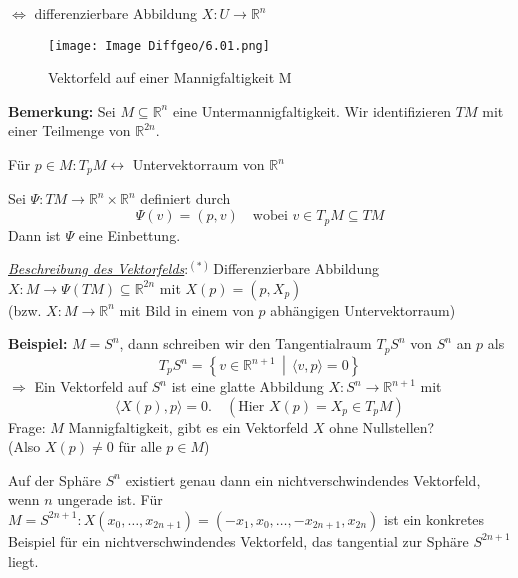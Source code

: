 \documentclass[fleqn, 12pt, letterpaper]{article}
\newcommand{\txt}[1]{\text{#1}}
\begin{document}
\smallskip

\noindent
\phantom{Vektorfelder} \quad \( \Longleftrightarrow \) \quad differenzierbare Abbildung \( X \colon U \to \mathbb{R}^n \)\\
\begin{figure}[H]
  \centering
  \texttt{[image: Image Diffgeo/6.01.png]}
\caption{Vektorfeld auf einer Mannigfaltigkeit M}
\end{figure}

\textbf{Bemerkung:} Sei \( M \subseteq \mathbb{R}^n \) eine Untermannigfaltigkeit. 
Wir identifizieren \( TM \) mit einer Teilmenge von \( \mathbb{R}^{2n} \).

\medskip

Für \( p \in M \colon T_p M \longleftrightarrow \) Untervektorraum von \( \mathbb{R}^n \)

\medskip

Sei \( \Psi \colon TM \to \mathbb{R}^n \times \mathbb{R}^n \) definiert durch
\[
\Psi(v) = (p, v) \quad \text{wobei } v \in T_p M \subseteq TM
\]
Dann ist \( \Psi \) eine Einbettung.

\emph{\underline{Beschreibung des Vektorfelds$:^{(*)}$}}Differenzierbare Abbildung \( X \colon M \to \Psi(TM) \subseteq \mathbb{R}^{2n} \) mit 
\(X(p) = (p,X_p) \)\\
(bzw. \( X \colon M \to \mathbb{R}^n \) mit Bild in einem von \( p \) abhängigen Untervektorraum)

\vspace{1em}

\noindent
\textbf{Beispiel:} \( M = S^n \), dann schreiben wir den Tangentialraum \( T_p S^n \) von \( S^n \) an \( p \) als
\[
T_p S^n = \left\{ v \in \mathbb{R}^{n+1} \,\middle|\, \langle v, p \rangle = 0 \right\}
\]
\(\Rightarrow\) Ein Vektorfeld auf \( S^n \) ist eine glatte Abbildung \( X \colon S^n \to \mathbb{R}^{n+1} \) mit
\[
\langle X(p), p \rangle = 0. \quad (\txt{Hier } X(p)=X_p\in T_pM)
\]
\colorbox{blue!20}{Frage:}
\( M \) Mannigfaltigkeit, gibt es ein Vektorfeld \( X \) ohne Nullstellen? \\
(Also \( X(p) \neq 0 \) für alle \( p \in M \))

\medskip

Auf der Sphäre $S^{n}$ existiert genau dann ein nichtverschwindendes Vektorfeld, wenn $n$ ungerade ist.
Für \( M = S^{2n+1} \colon X(x_0, \ldots, x_{2n+1}) = (-x_1, x_0, \ldots, -x_{2n+1}, x_{2n}) \)
ist ein konkretes Beispiel für ein nichtverschwindendes Vektorfeld, das tangential zur Sphäre $S^{2n+1}$ liegt. 
\vspace{1em}
\end{document}
